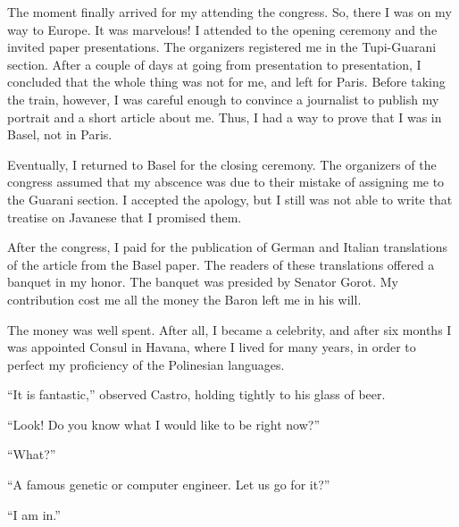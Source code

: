 \documentclass[a4paper,12pt]{book}
\begin{document}
The moment finally arrived for my
attending the congress. So, there
I was on my way to Europe.
It was marvelous! I attended to
the opening ceremony and the invited
paper presentations. The organizers
registered me in the Tupi-Guarani
section. After a couple of days at
going from presentation to presentation,
I concluded that the whole thing was
not for me, and left for Paris.
Before taking the train, however,
I was careful enough to convince a
journalist to publish my portrait
and a short article about me. Thus,
I had a way to prove that I was in
Basel, not in Paris.

Eventually, I returned to Basel for
the closing ceremony. The organizers
of the congress assumed that my
abscence was due to their mistake
of assigning me to the Guarani section.
I accepted the apology, but I still
was not able to write that treatise
on Javanese that I promised them.

After the congress, I paid for the publication
of German and Italian translations of the article
from the Basel paper. The readers of these
translations offered a banquet in my honor.
The banquet was presided by Senator Gorot.
My contribution cost me all the money
the Baron left me in his will.

The money was well spent. After all,
I became a celebrity, and after six
months I was appointed Consul in
Havana, where I lived for many years,
in order to perfect my proficiency
of the Polinesian languages.

``It is fantastic,'' observed Castro, holding
tightly to his glass of beer.

``Look! Do you know what I would like to
be right now?''

``What?''

``A famous genetic or computer engineer. Let us
go for it?''

``I am in.''
\end{document}
